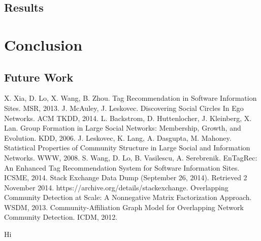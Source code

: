\documentclass[10pt]{IEEEtran}
\begin{document}
\subsection{Results}

\section{Conclusion}

\subsection{Future Work}

\begin{thebibliography}{1}
 X. Xia, D. Lo, X. Wang, B. Zhou. Tag Recommendation in Software Information Sites. MSR, 2013.
 J. McAuley, J. Leskovec. Discovering Social Circles In Ego Networks. ACM TKDD, 2014.
 L. Backstrom, D. Huttenlocher, J. Kleinberg, X. Lan. Group Formation in Large Social Networks: Membership, Growth, and Evolution. KDD, 2006.
 J. Leskovec, K. Lang, A. Dasgupta, M. Mahoney. Statistical Properties of Community Structure in Large Social and Information Networks. WWW, 2008.
 S. Wang, D. Lo, B. Vasilescu, A. Serebrenik. EnTagRec: An Enhanced Tag Recommendation System for Software Information Sites. ICSME, 2014.
 Stack Exchange Data Dump (September 26, 2014). Retrieved 2 November 2014. https://archive.org/details/stackexchange.
 Overlapping Community Detection at Scale: A Nonnegative Matrix Factorization Approach. WSDM, 2013.
 Community-Affiliation Graph Model for Overlapping Network Community Detection. ICDM, 2012.
\end{thebibliography}

\appendix

Hi

\end{document}
